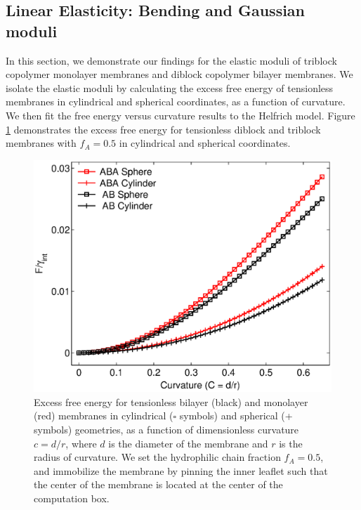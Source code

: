 \documentclass[twocolumn,aps,floatfix,nobibnotes]{revtex4-1}
\begin{document}
\subsection{Linear Elasticity: Bending and Gaussian moduli}

In this section, we demonstrate our findings for the elastic moduli of triblock copolymer monolayer membranes and diblock copolymer bilayer membranes. We isolate the elastic moduli by calculating the excess free energy of tensionless membranes in cylindrical and spherical coordinates, as a function of curvature. We then fit the free energy versus curvature results to the Helfrich model. Figure \ref{fig:FEC} demonstrates the excess free energy for tensionless diblock and triblock membranes with $f_A = 0.5$ in cylindrical and spherical coordinates. 

\begin{figure}[htp]
\centering
\includegraphics[width=1.0\columnwidth]{fE_C.eps}
\caption{Excess free energy for tensionless bilayer (black) and monolayer (red) membranes in cylindrical ($\square$ symbols) and spherical (+ symbols) geometries, as a function of dimensionless curvature $c = d/r$, where $d$ is the diameter of the membrane and $r$ is the radius of curvature. We set the hydrophilic chain fraction $f_A = 0.5$, and immobilize the membrane by pinning the inner leaflet such that the center of the membrane is located at the center of the computation box. }
\label{fig:FEC}
\centering
\end{figure}
\end{document}
